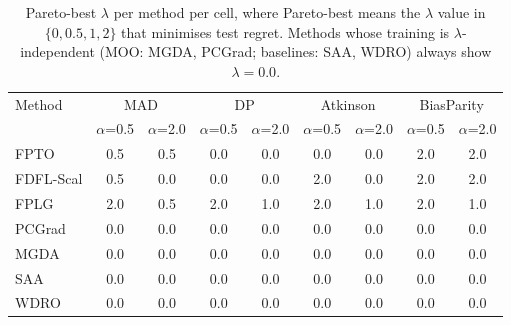 \begin{table}[t]
\centering
\small
\caption{Pareto-best $\lambda$ per method per cell, where Pareto-best means the $\lambda$ value in $\{0, 0.5, 1, 2\}$ that minimises test regret. Methods whose training is $\lambda$-independent (MOO: MGDA, PCGrad; baselines: SAA, WDRO) always show $\lambda = 0.0$.}
\label{tab:healthcare_best_lambda}
\begin{tabular}{lcccccccc}
\toprule
Method & \multicolumn{2}{c}{MAD} & \multicolumn{2}{c}{DP} & \multicolumn{2}{c}{Atkinson} & \multicolumn{2}{c}{BiasParity} \\
 & $\alpha$=0.5 & $\alpha$=2.0 & $\alpha$=0.5 & $\alpha$=2.0 & $\alpha$=0.5 & $\alpha$=2.0 & $\alpha$=0.5 & $\alpha$=2.0 \\
\midrule
FPTO & 0.5 & 0.5 & 0.0 & 0.0 & 0.0 & 0.0 & 2.0 & 2.0 \\
FDFL-Scal & 0.5 & 0.0 & 0.0 & 0.0 & 2.0 & 0.0 & 2.0 & 2.0 \\
FPLG & 2.0 & 0.5 & 2.0 & 1.0 & 2.0 & 1.0 & 2.0 & 1.0 \\
PCGrad & 0.0 & 0.0 & 0.0 & 0.0 & 0.0 & 0.0 & 0.0 & 0.0 \\
MGDA & 0.0 & 0.0 & 0.0 & 0.0 & 0.0 & 0.0 & 0.0 & 0.0 \\
SAA & 0.0 & 0.0 & 0.0 & 0.0 & 0.0 & 0.0 & 0.0 & 0.0 \\
WDRO & 0.0 & 0.0 & 0.0 & 0.0 & 0.0 & 0.0 & 0.0 & 0.0 \\
\bottomrule
\end{tabular}
\end{table}
